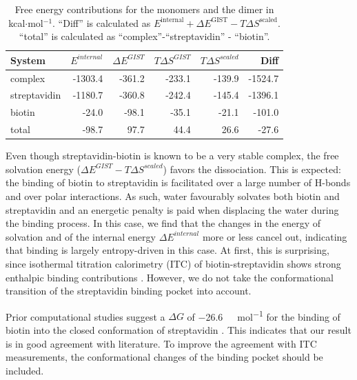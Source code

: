 \documentclass[9pt,tutorial]{livecoms}
\begin{document}
\begin{table}[h]
	\caption{Free energy contributions for the monomers and the dimer in kcal$\cdot$mol$^{-1}$. ``Diff'' is calculated as 
	$E^\text{internal} + \Delta E^\text{GIST} - T\Delta S^\text{scaled}$. ``total'' is calculated as 
	``complex''-``streptavidin'' - ``biotin''.}\label{tab_dg_monomers_dimer}
	\small
	\begin{tabular}{@{}lrrrrr@{}}
		\toprule
		System       & $E^{internal}$ & $\Delta E^\textit{GIST}$ & $T\Delta S^\textit{GIST}$ & $T\Delta S^\textit{scaled}$ & Diff \\
		\midrule
		complex      & -1303.4 & -361.2 & -233.1 & -139.9 & -1524.7 \\
		streptavidin & -1180.7 & -360.8 & -242.4 & -145.4 & -1396.1 \\
		biotin       & -24.0   &  -98.1 &  -35.1 &  -21.1 &  -101.0 \\
		\midrule
		total         & -98.7   &   97.7 &   44.4 &   26.6 &   -27.6 \\
		\bottomrule
	\end{tabular}
\end{table}
Even though streptavidin-biotin is known to be a very stable complex, the free solvation energy ($\Delta E^{GIST}-T\Delta S^{scaled}$) favors the dissociation.
This is expected: the binding of biotin to streptavidin is facilitated over a large number of H-bonds and over polar interactions. 
As such, water favourably solvates both biotin and streptavidin and an energetic penalty is paid when displacing the water during the binding process. 
In this case, we find that the changes in the energy of solvation and of the internal energy $\Delta E^{internal}$ more or less cancel out, indicating that binding is largely entropy-driven in this case.
At first, this is surprising, since isothermal titration calorimetry (ITC) of biotin-streptavidin shows strong enthalpic binding contributions \cite{mpye2020-biotin-itc,hyre2006-biotin-itc}.
However, we do not take the conformational transition of the streptavidin binding pocket into account.

Prior computational studies suggest a $\Delta G$ of \qty{-26.6}{\kilo\calorie\per\mole} for the binding of biotin into the closed conformation of streptavidin \cite{Bansal2018-biotin}.
This indicates that our result is in good agreement with literature.
To improve the agreement with ITC measurements, the conformational changes of the binding pocket should be included.
\end{document}
